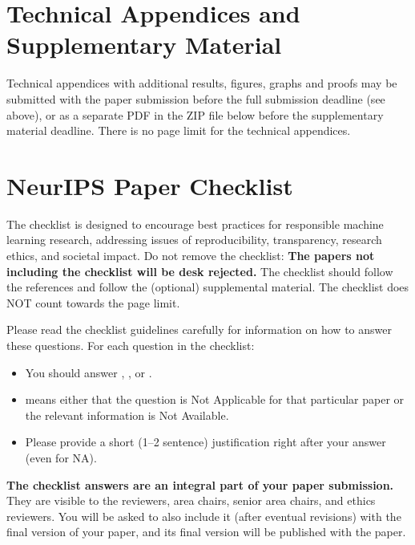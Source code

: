 \documentclass{article}
\begin{document}

\appendix

\section{Technical Appendices and Supplementary Material}
Technical appendices with additional results, figures, graphs and proofs may be submitted with the paper submission before the full submission deadline (see above), or as a separate PDF in the ZIP file below before the supplementary material deadline. There is no page limit for the technical appendices.


\newpage
\section*{NeurIPS Paper Checklist}

The checklist is designed to encourage best practices for responsible machine learning research, addressing issues of reproducibility, transparency, research ethics, and societal impact. Do not remove the checklist: {\bf The papers not including the checklist will be desk rejected.} The checklist should follow the references and follow the (optional) supplemental material.  The checklist does NOT count towards the page
limit. 

Please read the checklist guidelines carefully for information on how to answer these questions. For each question in the checklist:
\begin{itemize}
    \item You should answer \answerYes{}, \answerNo{}, or \answerNA{}.
    \item \answerNA{} means either that the question is Not Applicable for that particular paper or the relevant information is Not Available.
    \item Please provide a short (1–2 sentence) justification right after your answer (even for NA). 
\end{itemize}

{\bf The checklist answers are an integral part of your paper submission.} They are visible to the reviewers, area chairs, senior area chairs, and ethics reviewers. You will be asked to also include it (after eventual revisions) with the final version of your paper, and its final version will be published with the paper.
\end{document}
